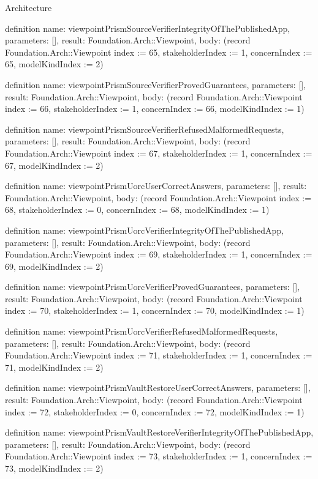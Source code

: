\begin{lexlean}{Architecture}
\begin{semanticmodule}
definition{
  name: viewpointPrismSourceVerifierIntegrityOfThePublishedApp,
  parameters: [],
  result: Foundation.Arch::Viewpoint,
  body: (record Foundation.Arch::Viewpoint {index := 65, stakeholderIndex := 1, concernIndex := 65, modelKindIndex := 2})
}

definition{
  name: viewpointPrismSourceVerifierProvedGuarantees,
  parameters: [],
  result: Foundation.Arch::Viewpoint,
  body: (record Foundation.Arch::Viewpoint {index := 66, stakeholderIndex := 1, concernIndex := 66, modelKindIndex := 1})
}

definition{
  name: viewpointPrismSourceVerifierRefusedMalformedRequests,
  parameters: [],
  result: Foundation.Arch::Viewpoint,
  body: (record Foundation.Arch::Viewpoint {index := 67, stakeholderIndex := 1, concernIndex := 67, modelKindIndex := 2})
}

definition{
  name: viewpointPrismUorcUserCorrectAnswers,
  parameters: [],
  result: Foundation.Arch::Viewpoint,
  body: (record Foundation.Arch::Viewpoint {index := 68, stakeholderIndex := 0, concernIndex := 68, modelKindIndex := 1})
}

definition{
  name: viewpointPrismUorcVerifierIntegrityOfThePublishedApp,
  parameters: [],
  result: Foundation.Arch::Viewpoint,
  body: (record Foundation.Arch::Viewpoint {index := 69, stakeholderIndex := 1, concernIndex := 69, modelKindIndex := 2})
}

definition{
  name: viewpointPrismUorcVerifierProvedGuarantees,
  parameters: [],
  result: Foundation.Arch::Viewpoint,
  body: (record Foundation.Arch::Viewpoint {index := 70, stakeholderIndex := 1, concernIndex := 70, modelKindIndex := 1})
}

definition{
  name: viewpointPrismUorcVerifierRefusedMalformedRequests,
  parameters: [],
  result: Foundation.Arch::Viewpoint,
  body: (record Foundation.Arch::Viewpoint {index := 71, stakeholderIndex := 1, concernIndex := 71, modelKindIndex := 2})
}

definition{
  name: viewpointPrismVaultRestoreUserCorrectAnswers,
  parameters: [],
  result: Foundation.Arch::Viewpoint,
  body: (record Foundation.Arch::Viewpoint {index := 72, stakeholderIndex := 0, concernIndex := 72, modelKindIndex := 1})
}

definition{
  name: viewpointPrismVaultRestoreVerifierIntegrityOfThePublishedApp,
  parameters: [],
  result: Foundation.Arch::Viewpoint,
  body: (record Foundation.Arch::Viewpoint {index := 73, stakeholderIndex := 1, concernIndex := 73, modelKindIndex := 2})
}


\end{semanticmodule}
\end{lexlean}
